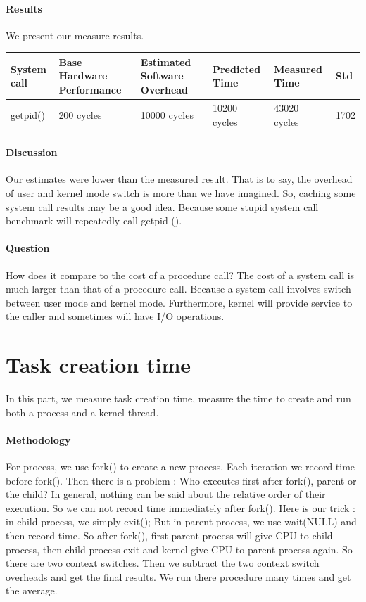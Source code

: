 \paragraph{Results}
We present our measure results.

\begin{center}
\begin{tabular}{| p{2cm} | p{3cm} | p{3cm} | p{2.5cm} | p{2.5cm} | p{2cm}}
System call  & Base Hardware Performance  & Estimated Software Overhead  & Predicted Time  & Measured Time  & Std \\
\hline
getpid() & 200 cycles& 10000 cycles& 10200 cycles& 43020 cycles & 1702\\
\end{tabular}
\end{center}

\paragraph{Discussion}
Our estimates were lower than the measured result. That is to say, the overhead of user and kernel mode switch is more than we have imagined. So, caching some system call results may be a good idea. Because some stupid system call benchmark will repeatedly call getpid ().

\paragraph{Question} How does it compare to the cost of a procedure call? The cost of a system call is much larger than that of a procedure call. Because a system call involves switch between user mode and kernel mode. Furthermore, kernel will provide service to the caller and sometimes will have I/O operations.

\section{Task creation time}
In this part, we measure task creation time, measure the time to create and run both a process and a kernel thread.

\paragraph{Methodology}
For process, we use fork() to create a new process.  Each iteration we record time before fork(). Then there is a problem : Who executes first after fork(), parent or the child? In general, nothing can be said about the relative order of their execution. So we can not record time immediately after fork(). Here is our trick : in child process, we simply exit(); But in parent process, we use wait(NULL) and then record time. So after fork(), first parent process will give CPU to child process, then child process exit and kernel give CPU to parent process again. So there are two context switches. Then we subtract the two context switch overheads and get the final results. We run there procedure many times and get the average.

